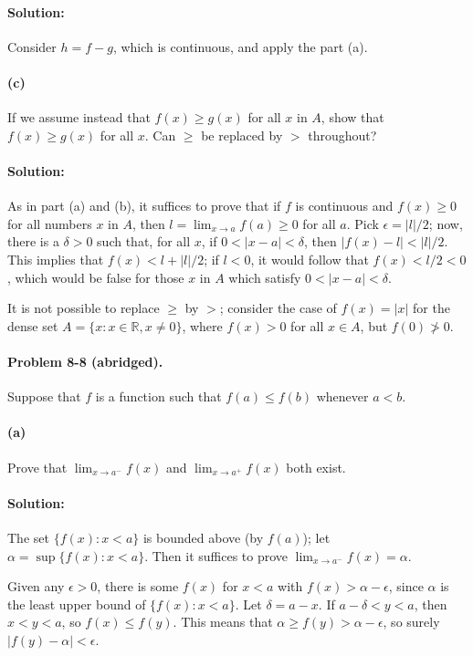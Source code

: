 \documentclass{article}
\begin{document}
\paragraph{Solution:} Consider $h = f - g$, which is continuous, and apply the
part (a).

\paragraph{(c)} If we assume instead that $f(x) \geq g(x)$ for all $x$ in $A$,
show that $f(x) \geq g(x)$ for all $x$. Can $\geq$ be replaced by $>$
throughout?

\paragraph{Solution:} As in part (a) and (b), it suffices to prove that if $f$
is continuous and $f(x) \geq 0$ for all numbers $x$ in $A$, then $l = \lim_{x
\rightarrow a}f(a) \geq 0$ for all $a$. Pick $\epsilon = |l|/2$; now, there is
a $\delta > 0$ such that, for all $x$, if $0 < |x - a| < \delta$, then $|f(x) -
l| < |l|/2$. This implies that $f(x) < l + |l|/2$; if $l < 0$, it would follow
that $f(x) < l/2 < 0$, which would be false for those $x$ in $A$ which satisfy
$0 < |x - a| < \delta$.

It is not possible to replace $\geq$ by $>$; consider the case of $f(x) = |x|$
for the dense set $A = \{x : x \in \mathbb{R}, x \neq 0\}$, where $f(x) > 0$
for all $x \in A$, but $f(0) \ngtr 0$.

\paragraph{Problem 8-8 (abridged).} Suppose that $f$ is a function such that
$f(a) \leq f(b)$ whenever $a < b$.

\paragraph{(a)} Prove that $\lim_{x \rightarrow a^-}f(x)$ and $\lim_{x
\rightarrow a^+}f(x)$ both exist.

\paragraph{Solution:} The set $\{f(x): x < a\}$ is bounded above (by $f(a)$);
let $\alpha = \sup\{f(x): x < a\}$. Then it suffices to prove $\lim_{x
\rightarrow a^-}f(x) = \alpha$.

Given any $\epsilon > 0$, there is some $f(x)$ for $x < a$ with $f(x) > \alpha
- \epsilon$, since $\alpha$ is the least upper bound of $\{f(x): x < a\}$. Let
$\delta = a - x$. If $a - \delta < y < a$, then $x < y < a$, so $f(x) \leq
f(y)$. This means that $\alpha \geq f(y) > \alpha - \epsilon$,  so surely
$|f(y) - \alpha| < \epsilon$.
\end{document}
